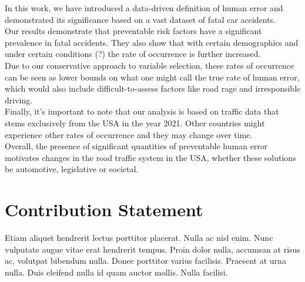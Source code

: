 \documentclass{article}
\theoremstyle{plain}
\theoremstyle{definition}
\theoremstyle{remark}
\begin{document}
In this work, we have introduced a data-driven definition of human error and demonstrated its significance based on a vast dataset of fatal car accidents.
\\
Our results demonstrate that preventable risk factors have a significant prevalence in fatal accidents. They also show that with certain demographics and under certain conditions (?) the rate of occurrence is further increased.
\\
Due to our conservative approach to variable selection, these rates of occurrence can be seen as lower bounds on what one might call the true rate of human error, which would also include difficult-to-assess factors like road rage and irresponsible driving.
\\
Finally, it's important to note that our analysis is based on traffic data that stems exclusively from the USA in the year 2021. Other countries might experience other rates of occurrence and they may change over time.
\\
Overall, the presence of significant quantities of preventable human error motivates changes in the road traffic system in the USA, whether these solutions be automotive, legislative or societal. 


\section*{Contribution Statement}

Etiam aliquet hendrerit lectus porttitor placerat. Nulla ac nisl enim. Nunc vulputate augue vitae erat hendrerit tempus. Proin dolor nulla, accumsan at risus ac, volutpat bibendum nulla. Donec porttitor varius facilisis. Praesent at urna nulla. Duis eleifend nulla id quam auctor mollis. Nulla facilisi.\\
\\






\end{document}
